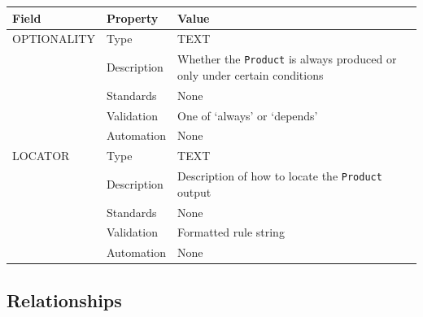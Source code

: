 \documentclass[
]{article}
\newcounter{none}
\begin{document}
{\def\LTcaptype{none} 
\begin{longtable}[]{@{}
  >{\raggedright\arraybackslash}p{}
  >{\raggedright\arraybackslash}p{}
  >{\raggedright\arraybackslash}p{}@{}}
\toprule\noalign{}
\begin{minipage}[b]{\linewidth}\raggedright
Field
\end{minipage} & \begin{minipage}[b]{\linewidth}\raggedright
Property
\end{minipage} & \begin{minipage}[b]{\linewidth}\raggedright
Value
\end{minipage} \\
\midrule\noalign{}
\endhead
\bottomrule\noalign{}
\endlastfoot
OPTIONALITY & Type & TEXT \\
& Description & Whether the \texttt{Product} is always produced or only
under certain conditions \\
& Standards & None \\
& Validation & One of `always' or `depends' \\
& Automation & None \\
LOCATOR & Type & TEXT \\
& Description & Description of how to locate the \texttt{Product}
output \\
& Standards & None \\
& Validation & Formatted rule string \\
& Automation & None \\
\end{longtable}
}

\subsection{Relationships}\label{relationships-21}
\end{document}
